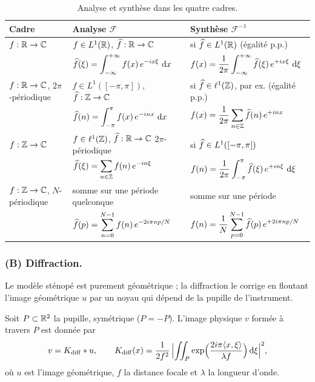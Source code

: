 \begin{table}[H]\centering\small
\setlength{\tabcolsep}{4pt}\renewcommand{\arraystretch}{1.5}
\begin{tabular}{|p{19mm}|p{50mm}|p{50mm}|}
  \hline
  Cadre & Analyse $\mathcal{F}$ & Synthèse $\mathcal{F}^{-1}$ \\ \hline
  $f:\mathbb{R}\to\mathbb{C}$
    & $f\in L^1(\mathbb{R})$, $\widehat{f}:\mathbb{R}\to\mathbb{C}$
    & si $\widehat{f}\in L^1(\mathbb{R})$ (égalité p.p.) \\
    & $\displaystyle\widehat{f}(\xi)=\int_{-\infty}^{+\infty}f(x)\,e^{-ix\xi}\,\mathop{}\!\mathrm{d} x$
    & $\displaystyle f(x)=\frac{1}{2\pi}\int_{-\infty}^{+\infty}\widehat{f}(\xi)\,e^{+ix\xi}\,\mathop{}\!\mathrm{d}\xi$ \\ \hline
  $f:\mathbb{R}\to\mathbb{C}$, $2\pi$-périodique
    & $f\in L^1([-\pi,\pi])$, $\widehat{f}:\mathbb{Z}\to\mathbb{C}$
    & si $\widehat{f}\in\ell^1(\mathbb{Z})$, par ex. (égalité p.p.) \\
    & $\displaystyle\widehat{f}(n)=\int_{-\pi}^{\pi}f(x)\,e^{-inx}\,\mathop{}\!\mathrm{d} x$
    & $\displaystyle f(x)=\frac{1}{2\pi}\sum_{n\in\mathbb{Z}}\widehat{f}(n)\,e^{+inx}$ \\ \hline
  $f:\mathbb{Z}\to\mathbb{C}$
    & $f\in\ell^1(\mathbb{Z})$, $\widehat{f}:\mathbb{R}\to\mathbb{C}$ $2\pi$-périodique
    & si $\widehat{f}\in L^1([-\pi,\pi])$ \\
    & $\displaystyle\widehat{f}(\xi)=\sum_{n\in\mathbb{Z}}f(n)\,e^{-in\xi}$
    & $\displaystyle f(n)=\frac{1}{2\pi}\int_{-\pi}^{\pi}\widehat{f}(\xi)\,e^{+in\xi}\,\mathop{}\!\mathrm{d}\xi$ \\ \hline
  $f:\mathbb{Z}\to\mathbb{C}$, $N$-périodique
    & somme sur une période quelconque
    & somme sur une période \\
    & $\displaystyle\widehat{f}(p)=\sum_{n=0}^{N-1}f(n)\,e^{-2i\pi np/N}$
    & $\displaystyle f(n)=\frac{1}{N}\sum_{p=0}^{N-1}\widehat{f}(p)\,e^{+2i\pi np/N}$ \\ \hline
\end{tabular}
\caption{Analyse et synthèse dans les quatre cadres.}\label{tab:fourier-cadres}
\end{table}

\subsubsection{(B) Diffraction.}
Le modèle sténopé est purement géométrique ; la diffraction le corrige en floutant l'image géométrique $u$ par un noyau qui dépend de la pupille de l'instrument.

\begin{theorem}[Diffraction]\label{thm:diffraction}
  Soit $P\subset\mathbb{R}^2$ la pupille, symétrique ($P=-P$). L'image physique $v$ formée à travers $P$ est donnée par
  \[
    v=K_{\mathrm{diff}}*u,\qquad
    K_{\mathrm{diff}}(x)=\frac{1}{2f^2}\,\Bigl|\iint_P\exp\Bigl(\frac{2i\pi\langle x,\xi\rangle}{\lambda f}\Bigr)\mathop{}\!\mathrm{d}\xi\Bigr|^2,
  \]
  où $u$ est l'image géométrique, $f$ la distance focale et $\lambda$ la longueur d'onde.
\end{theorem}

